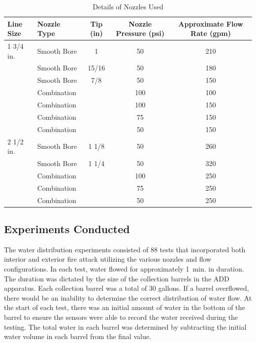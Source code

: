 \documentclass{article}
\begin{document}
\begin{table}[!ht]
\centering
\caption{Details of Nozzles Used}
\label{tab:nozzles_used_detail}
\begin{tabular}{llccc}
\toprule[1.5pt]
Line Size & Nozzle Type & Tip (in) & Nozzle Pressure (psi) & Approximate Flow Rate (gpm) \\ 
\midrule
1 3/4 in. & Smooth Bore          & 1      & 50 & 210 \\
          & Smooth Bore          & 15/16  & 50 & 180 \\
          & Smooth Bore          & 7/8    & 50 & 150 \\
          & Combination          &        & 100 & 100 \\
          & Combination          &        & 100 & 150 \\
          & Combination          &        & 75 & 150 \\
          & Combination          &        & 50 & 150 \\ \midrule
2 1/2 in. & Smooth Bore          & 1 1/8  & 50 & 260 \\
          & Smooth Bore          & 1 1/4  & 50 & 320 \\
          & Combination          &        & 100 & 250 \\
          & Combination          &        & 75 & 250 \\
          & Combination          &        & 50 & 250 \\
\bottomrule[1.25pt]
\end{tabular}
\end{table}

\subsection{Experiments Conducted}

The water distribution experiments consisted of 88 tests that incorporated both interior and exterior fire attack utilizing the various nozzles and flow configurations. In each test, water flowed for approximately 1~min. in duration. The duration was dictated by the size of the collection barrels in the ADD apparatus. Each collection barrel was a total of 30 gallons. If a barrel overflowed, there would be an inability to determine the correct distribution of water flow. At the start of each test, there was an initial amount of water in the bottom of the barrel to ensure the sensors were able to record the water received during the testing. The total water in each barrel was determined by subtracting the initial water volume in each barrel from the final value. 
\end{document}
